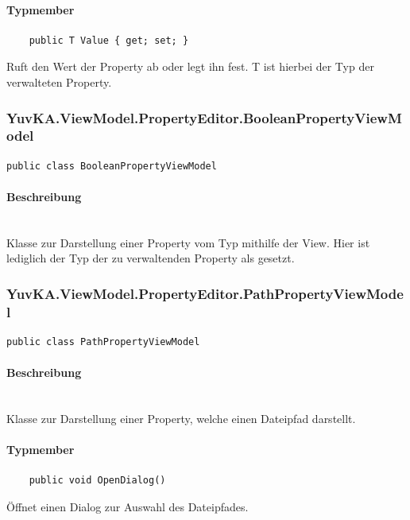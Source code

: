 \paragraph{Typmember}
\begin{itemize}

	\begin{verbatim}
	public T Value { get; set; }
	\end{verbatim}
	Ruft den Wert der Property ab oder legt ihn fest. T ist hierbei der Typ der verwalteten Property.
\end{itemize}




\subsubsection{YuvKA.ViewModel.PropertyEditor.BooleanPropertyViewModel}

\begin{verbatim}
public class BooleanPropertyViewModel
\end{verbatim}

\paragraph{Beschreibung}~\\
Klasse zur Darstellung einer Property vom Typ  mithilfe der View. Hier ist lediglich der Typ der zu verwaltenden Property als  gesetzt.




\subsubsection{YuvKA.ViewModel.PropertyEditor.PathPropertyViewModel}

\begin{verbatim}
public class PathPropertyViewModel
\end{verbatim}

\paragraph{Beschreibung}~\\
Klasse zur Darstellung einer Property, welche einen Dateipfad darstellt.

\paragraph{Typmember}
\begin{itemize}

	\begin{verbatim}
	public void OpenDialog()
	\end{verbatim}
	Öffnet einen Dialog zur Auswahl des Dateipfades.

\end{itemize}




